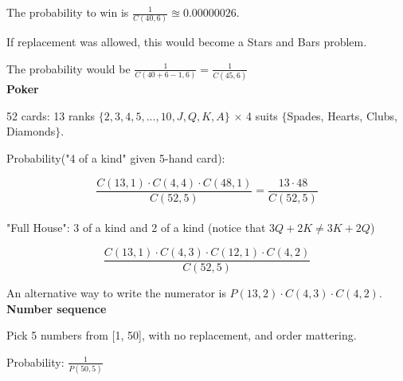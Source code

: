 \documentclass[english]{exam}
\begin{document}
    The probability to win is $\frac{1}{C(40,6)} \approxeq 0.00000026$.
    
    If replacement was allowed, this would become a Stars and Bars problem.
    
    The probability would be $\frac{1}{C(40+6-1, 6)} = \frac{1}{C(45,6)}$\\
    
    \textbf{Poker}
    
    52 cards: 13 ranks $\{2,3,4,5,...,10,J,Q,K,A\}$ $\times$ 4 suits $\{$Spades, Hearts, Clubs, Diamonds$\}$.
    
    Probability("4 of a kind" given 5-hand card):
    
    $$\frac{C(13,1) \cdot C(4,4) \cdot C(48,1)}{C(52,5)} = \frac{13 \cdot 48}{C(52,5)}$$\\
    
    "Full House": 3 of a kind and 2 of a kind (notice that $3Q + 2K \neq 3K + 2Q$)
    
    $$\frac{C(13,1) \cdot C(4,3) \cdot C(12,1) \cdot C(4,2)}{C(52,5)}$$
    
    An alternative way to write the numerator is $P(13,2) \cdot C(4,3) \cdot C(4,2)$.\\
    
    \textbf{Number sequence}
    
    Pick 5 numbers from [1, 50], with no replacement, and order mattering.
    
    Probability: $\frac{1}{P(50,5)}$
    
    
\end{document}
